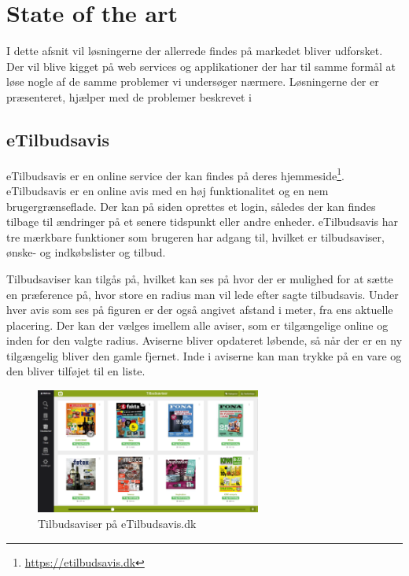 \chapter{State of the art}
I dette afsnit vil løsningerne der allerrede findes på markedet bliver udforsket.
Der vil blive kigget på web services og applikationer der har til samme formål at løse nogle af de samme problemer vi undersøger nærmere.
Løsningerne der er præsenteret, hjælper med de problemer beskrevet i 

\section{eTilbudsavis}
eTilbudsavis er en online service der kan findes på deres hjemmeside\footnote{\underline{https://etilbudsavis.dk}}. eTilbudsavis er en online avis med en høj funktionalitet og en nem brugergrænseflade.
Der kan på siden oprettes et login, således der kan findes tilbage til ændringer på et senere tidspunkt eller andre enheder.
eTilbudsavis har tre mærkbare funktioner som brugeren har adgang til, hvilket er tilbudsaviser, ønske- og indkøbslister og tilbud.

Tilbudsaviser kan tilgås på, hvilket kan ses på  hvor der er mulighed for at sætte en præference på, hvor store en radius man vil lede efter sagte tilbudsavis.
Under hver avis som ses på figuren er der også angivet afstand i meter, fra ens aktuelle placering. 
Der kan der vælges imellem alle aviser, som er tilgængelige online og inden for den valgte radius. 
Aviserne bliver opdateret løbende, så når der er en ny tilgængelig bliver den gamle fjernet. 
Inde i aviserne kan man trykke på en vare og den bliver tilføjet til en liste.

\begin{figure}
\vspace{-20pt}	
	\begin{center}
		\includegraphics[width=0.66\textwidth]{images/Images/eTilbudsavis.PNG}
	\end{center}
	\vspace{-20pt}
	\caption{Tilbudsaviser på eTilbudsavis.dk}
	\vspace{-20pt}
	\label{ss:eTilbudsavis}
\end{figure}

